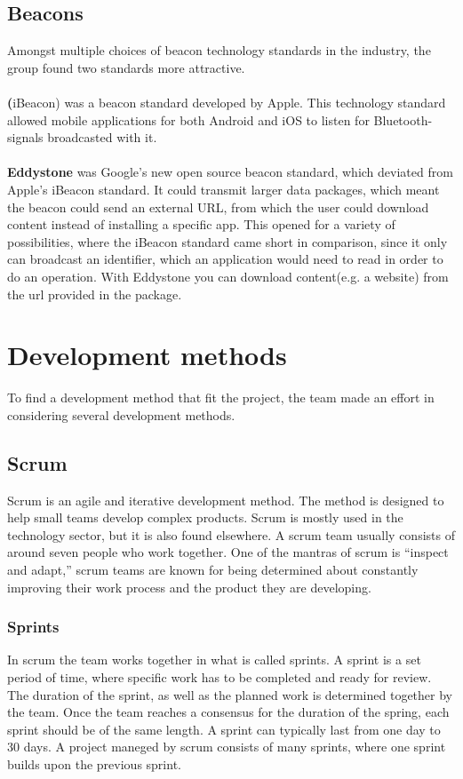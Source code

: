 \subsection{Beacons}
Amongst multiple choices of beacon technology standards in the industry, the group found two standards more attractive.
\\
\\
\textbf(iBeacon) was a beacon standard developed by Apple. This technology standard allowed mobile applications for both Android and iOS to listen for Bluetooth-signals broadcasted with it.
\\
\\
\textbf{Eddystone} was Google's new open source beacon standard, which deviated from Apple's iBeacon standard. It could transmit larger data packages, which meant the beacon could send an external URL, from which the user could download content instead of installing a specific app. This opened for a variety of possibilities, where the iBeacon standard came short in comparison, since it only can broadcast an identifier, which an application would need to read in order to do an operation. With Eddystone you can download content(e.g. a website) from the url provided in the package.



\section{Development methods}
To find a development method that fit the project, the team made an effort in considering several development methods.

\subsection{Scrum}
Scrum is an agile and iterative  development method. The method is designed to help small teams develop complex products. Scrum is mostly used in the technology sector, but it is also found elsewhere. A scrum team usually consists of around seven people who work together.  One of the mantras of scrum is “inspect and adapt,” scrum teams are known for being determined about constantly improving their work process and the product they are developing.\cite{agilelearning}

\subsubsection{Sprints}
In scrum the team works together in what is called sprints. A sprint is a set period of time, where specific work has to be completed and ready for review. The duration of the sprint, as well as the planned work is determined together by the team. Once the team reaches a consensus for the duration of the spring, each sprint should be of the same length. A sprint can typically last from one day to 30 days. A project maneged by scrum consists of many sprints, where one sprint builds upon the previous sprint.\cite{agile}

